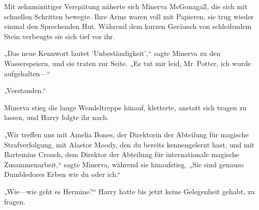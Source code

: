 Mit zehnminütiger Verspätung näherte sich Minerva McGonagall, die sich mit schnellen Schritten bewegte. Ihre Arme waren voll mit Papieren, sie trug wieder einmal den Sprechenden Hut. Während dem kurzen Geräusch von schleifendem Stein verbeugte sie sich tief vor ihr.

„Das neue Kennwort lautet 'Unbeständigkeit',“ sagte Minerva zu den Wasserspeiern, und sie traten zur Seite.
„Es tut mir leid, Mr~Potter, ich wurde aufgehalten—“

„Verstanden.“

Minerva stieg die lange Wendeltreppe hinauf, kletterte, anstatt sich tragen zu lassen, und Harry folgte ihr nach.

„Wir treffen uns mit Amelia Bones, der Direktorin der Abteilung für magische Strafverfolgung, mit Alastor Moody, den du bereits kennengelernt hast, und mit Bartemius Crouch, dem Direktor der Abteilung für internationale magische Zusammenarbeit,“ sagte Minerva, während sie hinaufstieg.
„Sie sind genauso Dumbledores Erben wie du oder ich.“

„Wie—wie geht es Hermine?“
Harry hatte bis jetzt keine Gelegenheit gehabt, zu fragen.

